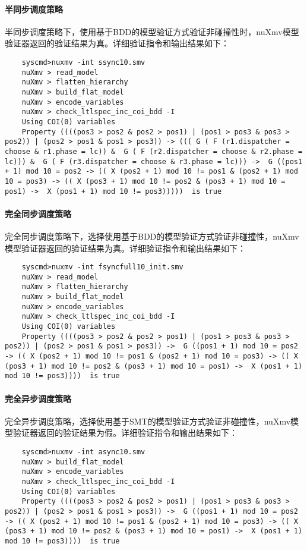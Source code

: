 \paragraph{半同步调度策略}
半同步调度策略下，使用基于BDD的模型验证方式验证非碰撞性时，nuXmv模型验证器返回的验证结果为真。详细验证指令和输出结果如下：

\begin{lstlisting}
    syscmd>nuxmv -int ssync10.smv
    nuXmv > read_model
    nuXmv > flatten_hierarchy
    nuXmv > build_flat_model
    nuXmv > encode_variables
    nuXmv > check_ltlspec_inc_coi_bdd -I
    Using COI(0) variables
    Property ((((pos3 > pos2 & pos2 > pos1) | (pos1 > pos3 & pos3 > pos2)) | (pos2 > pos1 & pos1 > pos3)) -> ((( G ( F (r1.dispatcher = choose & r1.phase = lc)) &  G ( F (r2.dispatcher = choose & r2.phase = lc))) &  G ( F (r3.dispatcher = choose & r3.phase = lc))) ->  G ((pos1 + 1) mod 10 = pos2 -> (( X (pos2 + 1) mod 10 != pos1 & (pos2 + 1) mod 10 = pos3) -> (( X (pos3 + 1) mod 10 != pos2 & (pos3 + 1) mod 10 = pos1) ->  X (pos1 + 1) mod 10 != pos3)))))  is true
\end{lstlisting}

\paragraph{完全同步调度策略}
完全同步调度策略下，选择使用基于BDD的模型验证方式验证非碰撞性，nuXmv模型验证器返回的验证结果为真。详细验证指令和输出结果如下：


\begin{lstlisting}
    syscmd>nuxmv -int fsyncfull10_init.smv
    nuXmv > read_model
    nuXmv > flatten_hierarchy
    nuXmv > build_flat_model
    nuXmv > encode_variables
    nuXmv > check_ltlspec_inc_coi_bdd -I
    Using COI(0) variables
    Property ((((pos3 > pos2 & pos2 > pos1) | (pos1 > pos3 & pos3 > pos2)) | (pos2 > pos1 & pos1 > pos3)) ->  G ((pos1 + 1) mod 10 = pos2 -> (( X (pos2 + 1) mod 10 != pos1 & (pos2 + 1) mod 10 = pos3) -> (( X (pos3 + 1) mod 10 != pos2 & (pos3 + 1) mod 10 = pos1) ->  X (pos1 + 1) mod 10 != pos3))))  is true
\end{lstlisting}

\paragraph{完全异步调度策略}
完全异步调度策略，选择使用基于SMT的模型验证方式验证非碰撞性，nuXmv模型验证器返回的验证结果为假。详细验证指令和输出结果如下：

\begin{lstlisting}
    syscmd>nuxmv -int async10.smv
    nuXmv > build_flat_model
    nuXmv > encode_variables
    nuXmv > check_ltlspec_inc_coi_bdd -I
    Using COI(0) variables
    Property ((((pos3 > pos2 & pos2 > pos1) | (pos1 > pos3 & pos3 > pos2)) | (pos2 > pos1 & pos1 > pos3)) ->  G ((pos1 + 1) mod 10 = pos2 -> (( X (pos2 + 1) mod 10 != pos1 & (pos2 + 1) mod 10 = pos3) -> (( X (pos3 + 1) mod 10 != pos2 & (pos3 + 1) mod 10 = pos1) ->  X (pos1 + 1) mod 10 != pos3))))  is true
\end{lstlisting}


